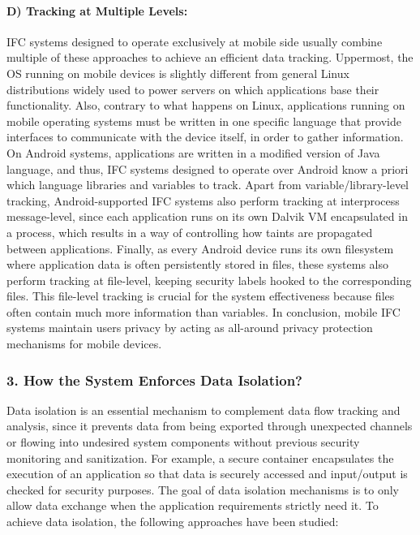 \paragraph{D) Tracking at Multiple Levels:}
IFC systems designed to operate exclusively at mobile side usually combine multiple of these approaches to achieve an efficient data tracking. Uppermost, the OS running on mobile devices is slightly different from general Linux distributions widely used to power servers on which applications base their functionality. Also, contrary to what happens on Linux, applications running on mobile operating systems must be written in one specific language that provide interfaces to communicate with the device itself, in order to gather information. On Android systems, applications are written in a modified version of Java language, and thus, IFC systems designed to operate over Android \cite{taintdroid,pebbles,mockdroid} know a priori which language libraries and variables to track. Apart from variable/library-level tracking, Android-supported IFC systems also perform tracking at interprocess message-level, since each application runs on its own Dalvik VM encapsulated in a process, which results in a way of controlling how taints are propagated between applications. Finally, as every Android device runs its own filesystem where application data is often persistently stored in files, these systems also perform tracking at file-level, keeping security labels hooked to the corresponding files. This file-level tracking is crucial for the system effectiveness because files often contain much more information than variables. In conclusion, mobile IFC systems maintain users privacy by acting as all-around privacy protection mechanisms for mobile devices.

\subsubsection{3. How the System Enforces Data Isolation?}
Data isolation is an essential mechanism to complement data flow tracking and analysis, since it prevents data from being exported through unexpected channels or flowing into undesired system components without previous security monitoring and sanitization. For example, a secure container encapsulates the execution of an application so that data is securely accessed and input/output is checked for security purposes. The goal of data isolation mechanisms is to only allow data exchange when the application requirements strictly need it. To achieve data isolation, the following approaches have been studied:

